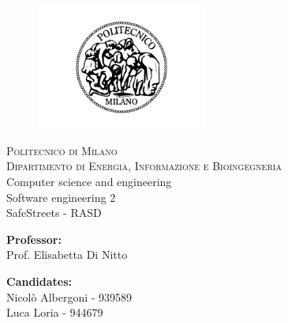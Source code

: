 


  \begin{titlepage}
    \begin{figure}[t]
        \centering\includegraphics[width=0.5\textwidth]{Images/logo_polimi}
    \end{figure}
    \begin{center}
        \textsc{ \LARGE{Politecnico di Milano \\}}
      \textsc{ \LARGE{Dipartimento di Energia, Informazione e Bioingegneria\\ }}
      \textnormal{ \LARGE{Computer science and engineering \\ Software engineering 2\\}}
      \vspace{30mm}
      \fontsize{10mm}{7mm}\selectfont 
        \textup{SafeStreets - RASD}\\
    \end{center}
    
    \vspace{25mm}
    
    \begin{minipage}[t]{0.47\textwidth}
      \textnormal{\large{\bf Professor:\\}}
      {\large Prof. Elisabetta Di Nitto}
    \end{minipage}\hfill\begin{minipage}[t]{0.47\textwidth}\raggedleft
      \textnormal{\large{\bf Candidates:\\}}
      {\large Nicolò Albergoni - 939589\\}
      {\large Luca Loria - 944679}
    \end{minipage}
    
    \vspace{20mm}
    
    
  \end{titlepage}
  
